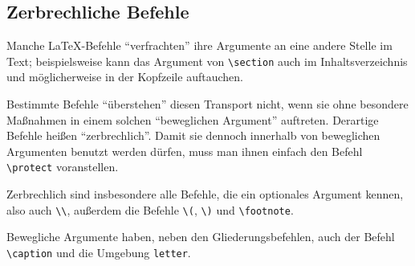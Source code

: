 \subsection{Zerbrechliche Befehle}
 
Manche \LaTeX-Befehle "`verfrachten"' ihre Argumente an eine andere
Stelle im Text; beispielsweise kann das Argument von \lstinline|\section|
auch im Inhaltsverzeichnis und möglicherweise in der Kopfzeile auftauchen.  

Bestimmte Befehle "`überstehen"' diesen Transport nicht, wenn sie
ohne besondere Maßnahmen in einem solchen "`beweglichen Argument"'
auftreten.
Derartige Befehle heißen "`zerbrechlich"'.  Damit sie dennoch innerhalb
von beweglichen Argumenten benutzt werden dürfen, 
muss man ihnen einfach den Befehl \lstinline|\protect| voranstellen.

Zerbrechlich sind insbesondere alle Befehle, die ein optionales Argument
kennen, also auch \lstinline|\\|,
außerdem die Befehle \lstinline|\(|, \lstinline|\)| und \lstinline|\footnote|.

Bewegliche Argumente haben, neben den Gliederungsbefehlen,
auch der Befehl \lstinline|\caption| und die Umgebung \texttt{letter}.


\endinput
